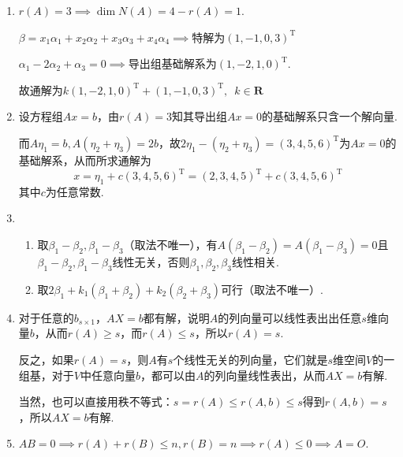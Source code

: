 \begin{enumerate}
    \item $r(A)=3\implies \dim{N(A)}=4-r(A)=1$.

          $\beta = x_1\alpha_1+x_2\alpha_2+x_3\alpha_3+x_4\alpha_4\implies$特解为$(1,-1,0,3)^\mathrm{T}$

          $\alpha_1-2\alpha_2+\alpha_3=0\implies$导出组基础解系为$(1,-2,1,0)^\mathrm{T}$.

          故通解为$k(1,-2,1,0)^\mathrm{T}+(1,-1,0,3)^\mathrm{T},\enspace k\in\mathbf{R}$

    \item 设方程组$Ax=b$，由$r(A)=3$知其导出组$Ax=0$的基础解系只含一个解向量.

          而$A\eta_1=b,A(\eta_2+\eta_3)=2b$，故$2\eta_1-(\eta_2+\eta_3)=(3,4,5,6)^\mathrm{T}$为$Ax=0$的基础解系，从而所求通解为
          \[ x = \eta_1+c(3,4,5,6)^\mathrm{T} = (2,3,4,5)^\mathrm{T} + c(3,4,5,6)^\mathrm{T} \]
          其中$c$为任意常数.

    \item \begin{enumerate}
              \item 取$\beta_1-\beta_2,\beta_1-\beta_3$（取法不唯一），有$A(\beta_1-\beta_2)=A(\beta_1-\beta_3)=0$且$\beta_1-\beta_2,\beta_1-\beta_3$线性无关，否则$\beta_1,\beta_2,\beta_3$线性相关.

              \item 取$2\beta_1+k_1(\beta_1+\beta_2)+k_2(\beta_2+\beta_3)$可行（取法不唯一）.
          \end{enumerate}

    \item 对于任意的$b_{s\times 1}$，$AX=b$都有解，说明$A$的列向量可以线性表出出任意$s$维向量$b$，从而$r(A)\geqslant s$，而$r(A)\leqslant s$，所以$r(A)=s$.

          反之，如果$r(A)=s$，则$A$有$s$个线性无关的列向量，它们就是$s$维空间$V$的一组基，对于$V$中任意向量$b$，都可以由$A$的列向量线性表出，从而$AX=b$有解.

          当然，也可以直接用秩不等式：$s=r(A)\leqslant r(A,b)\leqslant s$得到$r(A,b)=s$，所以$AX=b$有解.

    \item $AB=0\implies r(A)+r(B)\leqslant n,r(B)=n\implies r(A)\leqslant 0\implies A=O$.


\end{enumerate}
